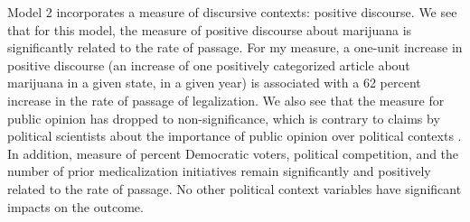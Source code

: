 
%

%



%


%


%







Model 2 incorporates a measure of discursive contexts: positive discourse. We see that for this model, the measure of positive discourse about marijuana is significantly related to the rate of passage. For my measure, a one-unit increase in positive discourse (an increase of one positively categorized article about marijuana in a given state, in a given year) is associated with a 62 percent increase in the rate of passage of legalization. We also see that the measure for public opinion has dropped to non-significance, which is contrary to claims by political scientists about the importance of public opinion over political contexts \citep{burstein_and_linton_2002}. In addition, measure of percent Democratic voters, political competition, and the number of prior medicalization initiatives remain significantly and positively related to the rate of passage. No other political context variables have significant impacts on the outcome.


